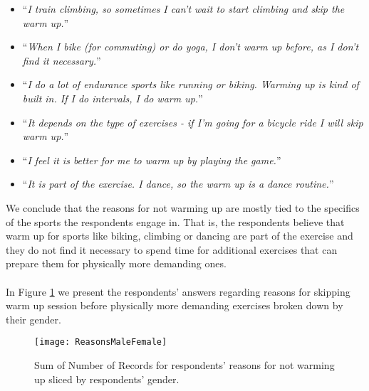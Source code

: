 \begin{itemize}
\item ``\textit{I train climbing, so sometimes I can't wait to start climbing and skip the warm up.}''
 \item ``\textit{When I bike (for commuting) or do yoga, I don't warm up before, as I don't find it necessary.}''
\item ``\textit{I do a lot of endurance sports like running or biking. Warming up is kind of built in. If I do intervals, I do warm up.}''
\item ``\textit{It depends on the type of exercises - if I'm going for a bicycle ride I will skip warm up.}''
\item ``\textit{I feel it is better for me to warm up by playing the game.}''
\item ``\textit{It is part of the exercise. I dance, so the warm up is a dance routine.}''
\end{itemize}
We conclude that the reasons for not warming up are mostly tied to the specifics of the sports the respondents engage in. That is, the respondents believe that warm up for sports like biking, climbing or dancing are part of the exercise and they do not find it necessary to spend time for additional exercises that can prepare them for physically more demanding ones.\\ \\
In Figure \ref{fig:ReasonsMaleFemale} we present the respondents' answers regarding reasons for skipping warm up session before physically more demanding exercises broken down by their gender.\\
\begin{figure}[h]
    \centering
    \texttt{[image: ReasonsMaleFemale]}
    \caption{Sum of Number of Records for respondents' reasons for not warming up sliced by respondents' gender.}
    \label{fig:ReasonsMaleFemale}
\end{figure}\\

